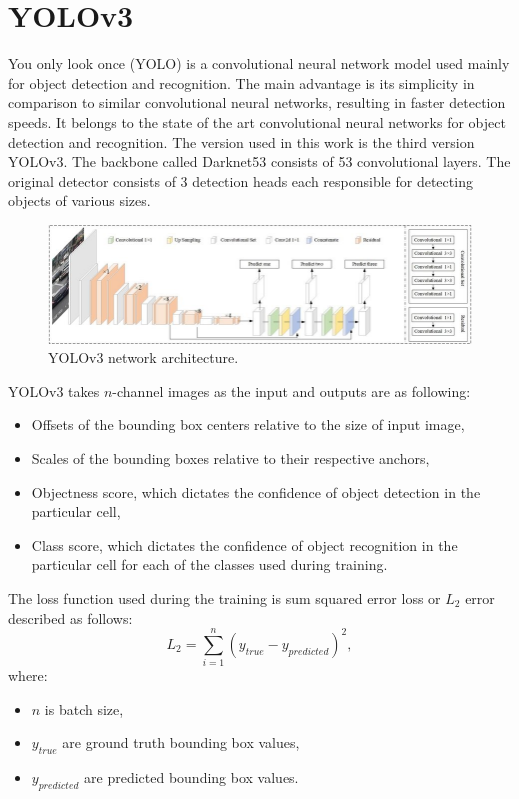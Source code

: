\documentclass[twoside]{ctuthesis}
\theoremstyle{plain}
\theoremstyle{definition}
\theoremstyle{note}
\begin{document}
\section{YOLOv3}
You only look once (YOLO) is a convolutional neural network model used mainly for object detection and recognition. The main advantage is its simplicity in comparison to similar convolutional neural networks, resulting in faster detection speeds. It belongs to the state of the art convolutional neural networks for object detection and recognition. The version used in this work is the third version YOLOv3. The backbone called Darknet53 consists of 53 convolutional layers. The original detector consists of 3 detection heads each responsible for detecting objects of various sizes.
\begin{figure}[h]
	\caption{YOLOv3 network architecture.}
	\centering
	\includegraphics[width=\textwidth]{yolov3model.jpg}
\end{figure}
YOLOv3 takes $n$-channel images as the input and outputs are as following:
\begin{itemize}
	\item Offsets of the bounding box centers relative to the size of input image,
	\item Scales of the bounding boxes relative to their respective anchors,
	\item Objectness score, which dictates the confidence of object detection in the particular cell,
	\item Class score, which dictates the confidence of object recognition in the particular cell for each of the classes used during training.
\end{itemize}
The loss function used during the training is sum squared error loss or $L_2$ error described as follows:
\begin{equation}
	L_2=\sum_{i=1}^{n}(y_{true}-y_{predicted})^2,
\end{equation}
where:
\begin{itemize}
	\item $n$ is batch size,
	\item $y_{true}$ are ground truth bounding box values,
	\item $y_{predicted}$ are predicted bounding box values.
\end{itemize}
\end{document}
